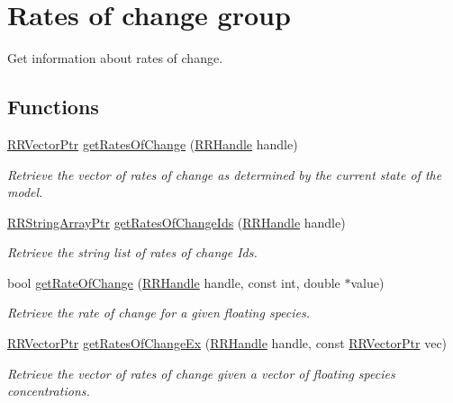 \hypertarget{group__rate_of_change}{\section{Rates of change group}
\label{group__rate_of_change}
}


Get information about rates of change.  


\subsection*{Functions}
\begin{DoxyCompactItemize}
\item 
\hyperlink{rrc__types_8h_a3be72d6006034fd349f753d2bf441bf7}{R\-R\-Vector\-Ptr} \hyperlink{group__rate_of_change_gab8675813f06e4017dbe9d7584dc2fceb}{get\-Rates\-Of\-Change} (\hyperlink{rrc__types_8h_a1d68f0592372208fa5a5f2799ea4b3ae}{R\-R\-Handle} handle)
\begin{DoxyCompactList}\small\item\em Retrieve the vector of rates of change as determined by the current state of the model. \end{DoxyCompactList}\item 
\hyperlink{rrc__types_8h_a7c9475df6c7337d99482b13a365e7596}{R\-R\-String\-Array\-Ptr} \hyperlink{group__rate_of_change_ga4713af515e980542c14a735bc0e43983}{get\-Rates\-Of\-Change\-Ids} (\hyperlink{rrc__types_8h_a1d68f0592372208fa5a5f2799ea4b3ae}{R\-R\-Handle} handle)
\begin{DoxyCompactList}\small\item\em Retrieve the string list of rates of change Ids. \end{DoxyCompactList}\item 
bool \hyperlink{group__rate_of_change_ga07c04f81f07fad80bc78369b122972c2}{get\-Rate\-Of\-Change} (\hyperlink{rrc__types_8h_a1d68f0592372208fa5a5f2799ea4b3ae}{R\-R\-Handle} handle, const int, double $\ast$value)
\begin{DoxyCompactList}\small\item\em Retrieve the rate of change for a given floating species. \end{DoxyCompactList}\item 
\hyperlink{rrc__types_8h_a3be72d6006034fd349f753d2bf441bf7}{R\-R\-Vector\-Ptr} \hyperlink{group__rate_of_change_ga4e1783d741cc0c81954db891e085c664}{get\-Rates\-Of\-Change\-Ex} (\hyperlink{rrc__types_8h_a1d68f0592372208fa5a5f2799ea4b3ae}{R\-R\-Handle} handle, const \hyperlink{rrc__types_8h_a3be72d6006034fd349f753d2bf441bf7}{R\-R\-Vector\-Ptr} vec)
\begin{DoxyCompactList}\small\item\em Retrieve the vector of rates of change given a vector of floating species concentrations. \end{DoxyCompactList}\end{DoxyCompactItemize}


